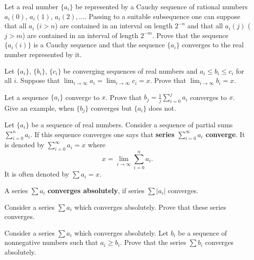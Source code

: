 \documentclass[12pt]{article}
\begin{document}
\begin{ukazanie} 
Let a real number $\{a_i\}$ be represented by a Cauchy sequence of
rational numbers $a_i(0)$, $a_i(1)$, $a_i(2),\ldots$. Passing to a
suitable subsequence one can suppose that all $a_i$ ($i> n$)
are contained in an interval on length $2^{-n}$ and that all $a_i(j)$ ($j>
m$) are contained in an interval of length $2^{-m}$. Prove that the
sequence $\{a_i(i)\}$ is a Cauchy sequence and that the sequence
$\{a_i\}$ converges to the real number represented by it.
\end{ukazanie}

\begin{zadacha}[!] 
Let $\{ a_i\}$, $\{b_i\}$,
$\{c_i\}$ be converging sequences of real numbers and  $a_i \leq b_i
\leq c_i$ for all $i$.  Suppose that 
$\lim_{i \to \infty} a_i = \lim_{i \to \infty} c_i =x$.  Prove that 
 $\lim_{i \to \infty} b_i =x$.
\end{zadacha}

\begin{zadacha}[*] Let a sequence $\{a_i\}$ converge
to $x$. Prove that $b_j = \frac 1 j
\sum_{i=0}^j a_i$ converges to $x$. Give an example, when $\{b_j\}$
converges but $\{a_i\}$ does not.
\end{zadacha}


\begin{opredelenie} Let $\{a_i\}$ be a sequence of real
  numbers. Consider a sequence of partial sums 
$\sum_{i=0}^n a_i$.  If this sequence converges one says that
 {\bf series $\sum_{i=0}^\infty a_i$ converge}. It is denoted by
$\sum_{i=0}^\infty a_i =x$ where
$$ 
   x = \lim_{i \to \infty} \sum_{i=0}^n a_i.
$$
It is often denoted by $\sum a_i =x$.
\end{opredelenie}

\begin{opredelenie} A series $\sum a_i$ {\bf  converges absolutely},
if series $\sum |a_i|$ converges.
\end{opredelenie}

\begin{zadacha}[!] Consider a series $\sum a_i$ which converges
  absolutely. Prove that these series converges.
\end{zadacha}

\begin{zadacha} Consider a series $\sum a_i$ which converges
  absolutely. Let $b_i$ be a sequence of nonnegative numbers such that
  $a_i \geq b_i$. Prove that the series $\sum b_i$ converges absolutely.
\end{zadacha}
\end{document}
